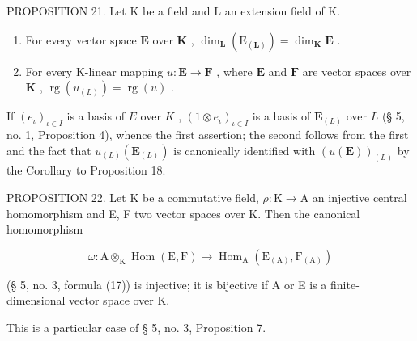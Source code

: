 PROPOSITION 21. Let K be a field and L an extension field of K.

\begin{enumerate}
\def\labelenumi{(\roman{enumi})}
\item
  For every vector space \(\mathbf{E}\) over \(\mathbf{K}\) , \(\dim_{\mathbf{L}}(\mathrm{E}_{(\mathbf{L})}) = \dim_{\mathbf{K}}\mathbf{E}\) .
\item
  For every K-linear mapping \(u: \mathbf{E} \to \mathbf{F}\) , where \(\mathbf{E}\) and \(\mathbf{F}\) are vector spaces over \(\mathbf{K}\) , \(\operatorname{rg}(u_{(L)}) = \operatorname{rg}(u)\) .
\end{enumerate}

If \((e_{\iota})_{\iota\in I}\) is a basis of \(E\) over \(K\) , \((1\otimes e_{\iota})_{\iota\in I}\) is a basis of \(\mathbf{E}_{(L)}\) over \(L\) (§ 5, no. 1, Proposition 4), whence the first assertion; the second follows from the first and the fact that \(u_{(L)}(\mathbf{E}_{(L)})\) is canonically identified with \((u(\mathbf{E}))_{(L)}\) by the Corollary to Proposition 18.

PROPOSITION 22. Let K be a commutative field, \(\rho: \mathrm{K} \to \mathrm{A}\) an injective central homomorphism and E, F two vector spaces over K. Then the canonical homomorphism

\[
\omega : \mathrm{A} \otimes_ {\mathrm{K}} \operatorname{Hom} (\mathrm{E}, \mathrm{F}) \rightarrow \operatorname{Hom} _ {\mathrm{A}} \left(\mathrm{E} _ {(\mathrm{A})}, \mathrm{F} _ {(\mathrm{A})}\right)\tag{36}
\]

(§ 5, no. 3, formula (17)) is injective; it is bijective if A or E is a finite-dimensional vector space over K.

This is a particular case of § 5, no. 3, Proposition 7.

